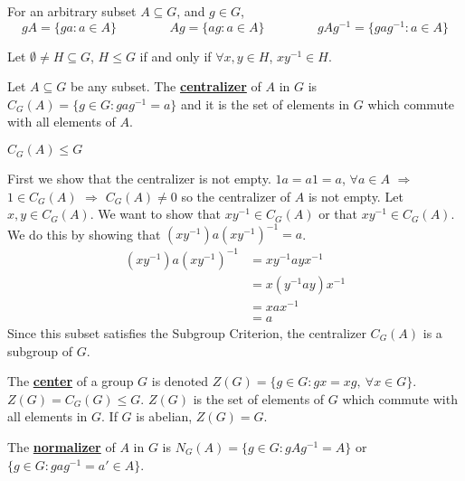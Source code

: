 \documentclass[11pt,letterpaper]{book}
\newcommand{\define}[1]{\underline{\textbf{#1}}}
\newcommand{\pn}[1]{\left( #1 \right)}
\theoremstyle{definition}
\begin{document}
For an arbitrary subset $A\subseteq G$, and $g\in G$,
$$gA=\{ga:a\in A\}\hspace{50pt}Ag=\{ag:a\in A\}\hspace{50pt}gAg^{-1}=\{gag^{-1}:a\in A\}$$

\begin{bthm}
    Let $\emptyset\ne H\subseteq G$, $H\le G$ if and only if $\forall x,y\in H$, $xy^{-1}\in H$.
\end{bthm}

\begin{defi}
    Let $A\subseteq G$ be any subset. The \define{centralizer} of $A$ in $G$ is $C_G(A)=\{g\in G:gag^{-1}=a\}$ and it is the set of elements in $G$ which commute with all elements of $A$.
\end{defi}

\begin{prop}
    $C_G(A)\le G$
\end{prop}

\begin{pf}
    First we show that the centralizer is not empty. $1a=a1=a$, $\forall a\in A$ $\Rightarrow$ $1\in C_G(A)$ $\Rightarrow$ $C_G(A)\ne0$ so the centralizer of $A$ is not empty. Let $x,y\in C_G(A)$. We want to show that $xy^{-1}\in C_G(A)$ or that $xy^{-1}\in C_G(A)$. We do this by showing that $\pn{xy^{-1}}a\pn{xy^{-1}}^{-1}=a$.
    \begin{align*}
        \pn{xy^{-1}}a\pn{xy^{-1}}^{-1}&=xy^{-1}ayx^{-1}\\
        &=x\pn{y^{-1}ay}x^{-1}\\
        &=xax^{-1}\tag*{($y\in C_G(A)$)}\\
        &=a\tag*{($x\in C_G(A)$)}
    \end{align*}
    Since this subset satisfies the Subgroup Criterion, the centralizer $C_G(A)$ is a subgroup of $G$.
\end{pf}

\begin{defi}
    The \define{center} of a group $G$ is denoted $Z(G)=\{g\in G:gx=xg,\ \forall x\in G\}$. $Z(G)=C_G(G)\le G$. $Z(G)$ is the set of elements of $G$ which commute with all elements in $G$. If $G$ is abelian, $Z(G)=G$.
\end{defi}

\begin{defi}
    The \define{normalizer} of $A$ in $G$ is $N_G(A)=\{g\in G:gAg^{-1}=A\}$ or $\{g\in G:gag^{-1}=a'\in A\}$.
\end{defi}
\end{document}
